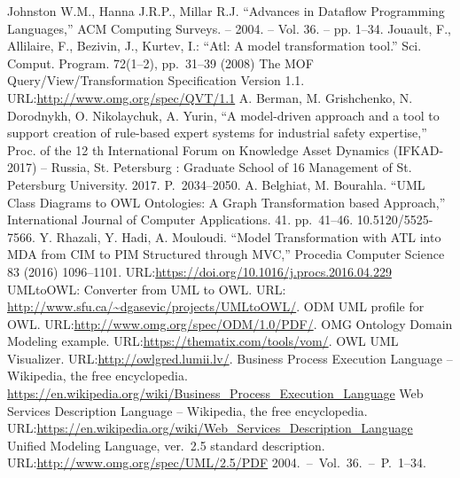 \documentclass[runningheads]{llncs}
\begin{document}
\begin{thebibliography}{11}
 Johnston W.M., Hanna J.R.P., Millar R.J. ``Advances in Dataflow Programming Languages,''
  ACM Computing Surveys. -- 2004. -- Vol. 36. -- pp. 1--34.
 Jouault, F., Allilaire, F., Bezivin, J., Kurtev, I.: ``Atl: A model transformation tool.'' Sci. Comput. Program. 72(1--2), pp.~31--39 (2008)
 The MOF Query/View/Transformation Specification Version 1.1. URL:\url{http://www.omg.org/spec/QVT/1.1}
 A. Berman, M. Grishchenko, N. Dorodnykh, O. Nikolaychuk, A. Yurin, ``A model-driven approach and a tool to support creation of rule-based expert systems for industrial safety expertise,'' Proc. of the 12 th International Forum on Knowledge Asset Dynamics (IFKAD-2017) -- Russia, St. Petersburg : Graduate School of 16 Management of St. Petersburg University.  2017.  P.~2034--2050.
 A. Belghiat, M. Bourahla. ``UML Class Diagrams to OWL Ontologies: A Graph Transformation based Approach,'' International Journal of Computer Applications. 41. pp.~41--46. 10.5120/5525-7566.
Y. Rhazali, Y. Hadi, A. Mouloudi. ``Model Transformation with ATL into MDA from CIM to PIM Structured through MVC,'' Procedia Computer Science 83 (2016) 1096–1101. URL:\url{https://doi.org/10.1016/j.procs.2016.04.229}
 UMLtoOWL: Converter from UML to OWL. URL: \url{http://www.sfu.ca/~dgasevic/projects/UMLtoOWL/}.
 ODM UML profile for OWL. URL:\url{http://www.omg.org/spec/ODM/1.0/PDF/}.
 OMG Ontology Domain Modeling example. URL:\url{https://thematix.com/tools/vom/}.
 OWL UML Visualizer. URL:\url{http://owlgred.lumii.lv/}.
 Business Process Execution Language -- Wikipedia, the free encyclopedia. \url{https://en.wikipedia.org/wiki/Business_Process_Execution_Language}
 Web Services Description Language -- Wikipedia, the free encyclopedia.  URL:\url{https://en.wikipedia.org/wiki/Web_Services_Description_Language}
 Unified Modeling Language, ver.~2.5 standard description. URL:\url{http://www.omg.org/spec/UML/2.5/PDF}
  2004.~--~Vol.~36.~--~P.~1--34.
\end{thebibliography}




\end{document}
